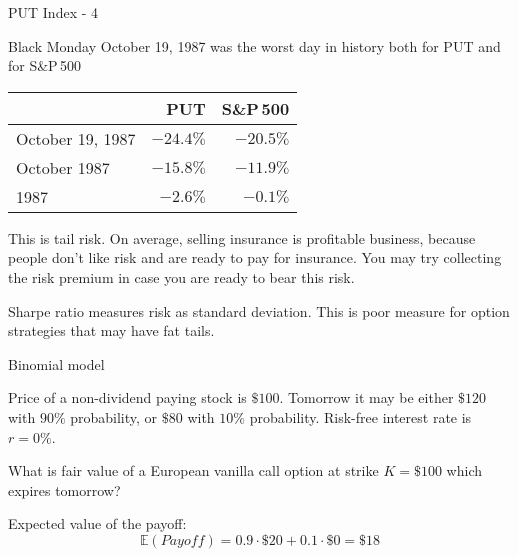 \documentclass{beamer}
\begin{document}
\begin{frame}{PUT Index - 4}

\justify
Black Monday October 19, 1987 was the worst day in history both for PUT and for S\&P\,500

\centering
\begin{tabular}{l|r|r}
& PUT & S\&P\,500 \\ \hline
October 19, 1987 & $-24.4\%$ & $-20.5\%$ \\
October 1987 & $-15.8\%$ & $-11.9\%$ \\
1987 & $-2.6\%$ & $-0.1\%$ 
\end{tabular}

\justify
This is \alert{tail risk}. On average, selling insurance is profitable business, because people don't like risk and are ready to pay for insurance. You may try collecting the risk premium in case you are ready to bear this risk.

\justify
Sharpe ratio measures risk as standard deviation. This is poor measure for option strategies that may have fat tails.
\end{frame}

\newcommand{\drawStockNode}[5]{

	\node (#5)
	[
		draw,
		rectangle,
		rounded corners,
		inner sep = 0pt,
		outer sep = 0pt,
		minimum width = 2.4cm,
		minimum height = 0.55cm,
		align = center
	]
	at (#3, #4)
	{
		\begin{tabular}{c|c}
		#1 & #2
		\end{tabular}
	};
}

\newcommand{\drawStockLink}[4]{

	\draw[
		->,
		>=triangle 90
	]
	(#1.east) -- (#2.west)
	node[
		pos = 0.5,
		anchor = #4
	]
	{#3};
}

\newcommand{\drawOneStepBinomialTree}{
	\drawStockNode{\$100}{?}{0}{0}{S0_node}
	\drawStockNode{\$120}{\$20}{4}{ 1}{Su_node}
	\drawStockNode{\$80}{\$0}{4}{-1}{Sd_node}
	
	\drawStockLink{S0_node}{Su_node}{$90\%$}{south east}	
	\drawStockLink{S0_node}{Sd_node}{$10\%$}{north east}
}

\begin{frame}{Binomial model}
\centering
{}

\justify
Price of a non-dividend paying stock is $\$100$. Tomorrow it may be either $\$120$ with $90\%$ probability, or $\$80$ with  $10\%$ probability. Risk-free interest rate is $r=0\%$.

\justify
What is fair value of a European vanilla call option at strike $K=\$100$ which expires tomorrow?

\justify
Expected value of the payoff:
$$\mathbb{E}(Payoff) = 0.9\cdot \$20 + 0.1\cdot \$0 = \$18 $$
\end{frame}
\end{document}
